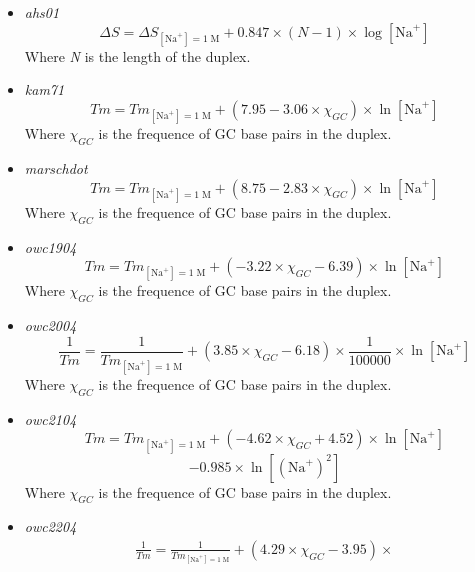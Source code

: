 \documentclass{article}
\begin{document}
 \begin{itemize}
 \item \textit{ahs01}
 \begin{displaymath}
  \Delta{}S=\Delta{}S_{[\mbox{Na}^+]=1\;\mathrm{M}}+0.847 \times (N - 1) \times \log [\mbox{Na}^+]   
 \end{displaymath}
 Where \emph{N} is the length of the duplex.
 \item \textit{kam71}
 \begin{displaymath}
  Tm=Tm_{[\mbox{Na}^+]=1\;\mathrm{M}}+(7.95 - 3.06 \times \chi_{GC}) \times \ln [\mbox{Na}^+]  
 \end{displaymath}
 Where \emph{$\chi_{GC}$} is the frequence of GC base pairs in the duplex.
 \item \textit{marschdot}
 \begin{displaymath}
  Tm=Tm_{[\mbox{Na}^+]=1\;\mathrm{M}}+ (8.75 - 2.83 \times \chi_{GC}) \times \ln [\mbox{Na}^+]  
 \end{displaymath}
 Where \emph{$\chi_{GC}$} is the frequence of GC base pairs in the duplex.
 \item \textit{owc1904}
 \begin{displaymath}
  Tm=Tm_{[\mbox{Na}^+]=1\;\mathrm{M}}+ (-3.22 \times \chi_{GC} - 6.39) \times \ln [\mbox{Na}^+]  
 \end{displaymath}
 Where \emph{$\chi_{GC}$} is the frequence of GC base pairs in the duplex.
 \item \textit{owc2004}
 \begin{displaymath}
 \frac{1}{Tm}=\frac{1}{Tm_{[\mbox{Na}^+]=1\;\mathrm{M}}}+ (3.85 \times \chi_{GC} - 6.18) \times \frac{1}{100000} \times \ln [\mbox{Na}^+]  
 \end{displaymath}
 Where \emph{$\chi_{GC}$} is the frequence of GC base pairs in the duplex.
 \item \textit{owc2104}
 \begin{displaymath}
 Tm=Tm_{[\mbox{Na}^+]=1\;\mathrm{M}}+ (-4.62 \times \chi_{GC} + 4.52) \times \ln [\mbox{Na}^+] 
 \end{displaymath}
 \begin{displaymath}
 - 0.985 \times \ln [(\mbox{Na}^+)^2]  
 \end{displaymath}
 Where \emph{$\chi_{GC}$} is the frequence of GC base pairs in the duplex.
 \item \textit{owc2204}
 \begin{multline*}
 \frac{1}{Tm}=\frac{1}{Tm_{[\mbox{Na}^+]=1\;\mathrm{M}}}+ (4.29 \times \chi_{GC} - 3.95) \times 
 \end{multline*}

\end{itemize}
\end{document}
